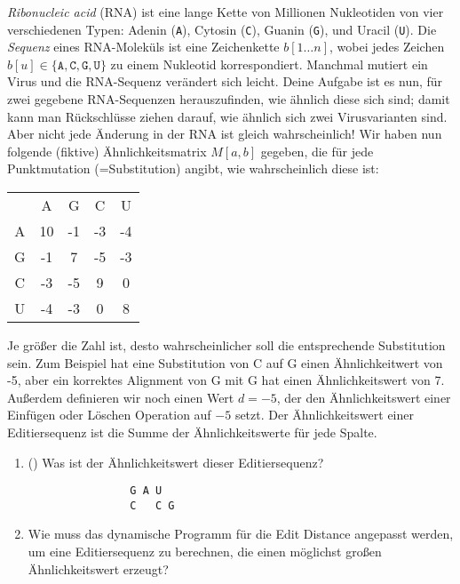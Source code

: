 \documentclass{uebung_cs}
\begin{document}
\begin{aufgabe}[RNA]
    \emph{Ribonucleic acid} (RNA) ist eine lange Kette von Millionen Nukleotiden von vier verschiedenen Typen:
    Adenin (\verb|A|), Cytosin (\verb|C|), Guanin (\verb|G|), und Uracil (\verb|U|). Die \emph{Sequenz} eines RNA-Moleküls ist eine Zeichenkette $b[1\dots n]$, wobei jedes Zeichen $b[u]\in\{\texttt{A}, \texttt{C}, \texttt{G}, \texttt{U}\}$ zu einem Nukleotid korrespondiert.
        Manchmal mutiert ein Virus und die RNA-Sequenz verändert sich leicht. Deine Aufgabe ist es nun, für zwei gegebene RNA-Sequenzen herauszufinden, wie ähnlich diese sich sind; damit kann man Rückschlüsse ziehen darauf, wie ähnlich sich zwei Virusvarianten sind. Aber nicht jede Änderung in der RNA ist gleich wahrscheinlich! Wir haben nun folgende (fiktive) Ähnlichkeitsmatrix $M[a,b]$ gegeben, die für jede Punktmutation (=Substitution) angibt, wie wahrscheinlich diese ist:

        \begin{tabular}{ccccc}
             & A  & G &  C & U\\
           A & 10 &-1 & -3 & -4\\
           G & -1 & 7 & -5 & -3\\
           C & -3 &-5 &  9 &  0\\
           U & -4 &-3 &  0 &  8\\
        \end{tabular}

        Je größer die Zahl ist, desto wahrscheinlicher soll die entsprechende Substitution sein.
        Zum Beispiel hat eine Substitution von C auf G einen Ähnlichkeitwert von -5, aber ein korrektes Alignment von G mit G hat einen Ähnlichkeitswert von 7.
        Außerdem definieren wir noch einen Wert $d=-5$, der den Ähnlichkeitswert einer Einfügen oder Löschen Operation auf $-5$ setzt.
        Der Ähnlichkeitswert einer Editiersequenz ist die Summe der Ähnlichkeitswerte für jede Spalte.
        \begin{enumerate}
            \item(\warmup) Was ist der Ähnlichkeitswert dieser Editiersequenz?
            \begin{verbatim}
                G A U  
                C   C G
            \end{verbatim}
            \item Wie muss das dynamische Programm für die Edit Distance angepasst werden, um eine Editiersequenz zu berechnen, die einen möglichst großen Ähnlichkeitswert erzeugt?
        \end{enumerate}
\end{aufgabe}
\end{document}
